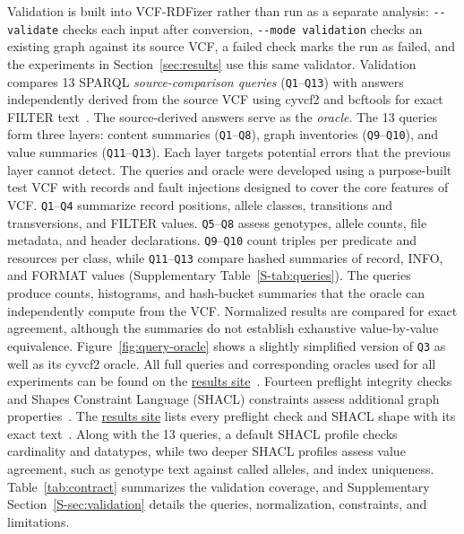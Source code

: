 \documentclass[pdflatex,sn-mathphys-num,referee]{sn-jnl}
\begin{document}
Validation is built into VCF-RDFizer rather than run as a separate analysis: \texttt{-{}-validate} checks each input after conversion, \texttt{-{}-mode validation} checks an existing graph against its source VCF, a failed check marks the run as failed, and the experiments in Section~\ref{sec:results} use this same validator.
Validation compares 13 SPARQL \emph{source-comparison queries} (\texttt{Q1}--\texttt{Q13}) with answers independently derived from the source VCF using cyvcf2 and bcftools for exact FILTER text~\cite{vcf_intro,cyvcf2_2017,BCFtools}.
The source-derived answers serve as the \emph{oracle}.
The 13 queries form three layers: content summaries (\texttt{Q1}--\texttt{Q8}), graph inventories (\texttt{Q9}--\texttt{Q10}), and value summaries (\texttt{Q11}--\texttt{Q13}).
Each layer targets potential errors that the previous layer cannot detect.
The queries and oracle were developed using a purpose-built test VCF with records and fault injections designed to cover the core features of VCF.
\texttt{Q1}--\texttt{Q4} summarize record positions, allele classes, transitions and transversions, and FILTER values.
\texttt{Q5}--\texttt{Q8} assess genotypes, allele counts, file metadata, and header declarations.
\texttt{Q9}--\texttt{Q10} count triples per predicate and resources per class, while \texttt{Q11}--\texttt{Q13} compare hashed summaries of record, INFO, and FORMAT values (Supplementary Table~\ref{S-tab:queries}).
The queries produce counts, histograms, and hash-bucket summaries that the oracle can independently compute from the VCF.
Normalized results are compared for exact agreement, although the summaries do not establish exhaustive value-by-value equivalence.
Figure~\ref{fig:query-oracle} shows a slightly simplified version of \texttt{Q3} as well as its cyvcf2 oracle.
All full queries and corresponding oracles used for all experiments can be found on the \href{https://ecrum19.github.io/vcf-rdfizer-testing/}{results site}~\cite{vcfrdfizer_results_site}.
Fourteen preflight integrity checks and Shapes Constraint Language (SHACL) constraints assess additional graph properties~\cite{shacl2017}.
The \href{https://ecrum19.github.io/vcf-rdfizer-testing/\#rq1-checks}{results site} lists every preflight check and SHACL shape with its exact text~\cite{vcfrdfizer_results_site}.
Along with the 13 queries, a default SHACL profile checks cardinality and datatypes, while two deeper SHACL profiles assess value agreement, such as genotype text against called alleles, and index uniqueness.
Table~\ref{tab:contract} summarizes the validation coverage, and Supplementary Section~\ref{S-sec:validation} details the queries, normalization, constraints, and limitations.
\end{document}
